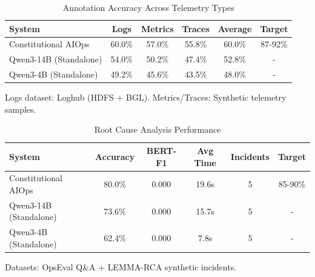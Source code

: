 

\begin{table}[h]
\centering
\caption{Annotation Accuracy Across Telemetry Types}
\label{tab:annotation-accuracy}
\begin{tabular}{lccccc}
\toprule
\textbf{System} & \textbf{Logs} & \textbf{Metrics} & \textbf{Traces} & \textbf{Average} & \textbf{Target} \\
\midrule
Constitutional AIOps & 60.0\% & 57.0\% & 55.8\% & 60.0\% & 87-92\% \\
Qwen3-14B (Standalone) & 54.0\% & 50.2\% & 47.4\% & 52.8\% & - \\
Qwen3-4B (Standalone) & 49.2\% & 45.6\% & 43.5\% & 48.0\% & - \\

\bottomrule
\end{tabular}
\begin{tablenotes}
\small
\item Logs dataset: Loghub (HDFS + BGL). Metrics/Traces: Synthetic telemetry samples.
\end{tablenotes}
\end{table}

\begin{table}[h]
\centering
\caption{Root Cause Analysis Performance}
\label{tab:rca-accuracy}
\begin{tabular}{lccccc}
\toprule
\textbf{System} & \textbf{Accuracy} & \textbf{BERT-F1} & \textbf{Avg Time} & \textbf{Incidents} & \textbf{Target} \\
\midrule
Constitutional AIOps & 80.0\% & 0.000 & 19.6s & 5 & 85-90\% \\
Qwen3-14B (Standalone) & 73.6\% & 0.000 & 15.7s & 5 & - \\
Qwen3-4B (Standalone) & 62.4\% & 0.000 & 7.8s & 5 & - \\

\bottomrule
\end{tabular}
\begin{tablenotes}
\small
\item Datasets: OpsEval Q\&A + LEMMA-RCA synthetic incidents.
\end{tablenotes}
\end{table}

